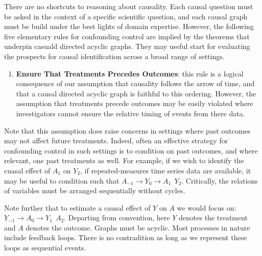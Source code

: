 \documentclass[
  single column]{article}
\providecommand{\tightlist}{%
  \setlength{\itemsep}{0pt}\setlength{\parskip}{0pt}}\usepackage{longtable,booktabs,array}
\begin{document}
There are no shortcuts to reasoning about causality. Each causal
question must be asked in the context of a specific scientific question,
and each causal graph must be build under the best lights of domain
expertise. However, the following five elementary rules for confounding
control are implied by the theorems that underpin casuald directed
acyclic graphs. They may useful start for evaluating the prospects for
causal identification across a broad range of settings.

\begin{enumerate}
\def\labelenumi{\arabic{enumi}.}
\tightlist
\item
  \textbf{Ensure That Treatments Precedes Outcomes}: this rule is a
  logical consequence of our assumption that causality follows the arrow
  of time, and that a causal directed acyclic graph is faithful to this
  ordering. However, the assumption that treatments precede outcomes may
  be easily violated where investigators cannot ensure the relative
  timing of events from there data.
\end{enumerate}

Note that this assumption does raise concerns in settings where past
outcomes may not affect future treatments. Indeed, often an effective
strategy for confounding control in such settings is to condition on
past outcomes, and where relevant, one past treatments as well. For
example, if we wish to identify the cuasal effect of \(A_1\) on \(Y_2\),
if repeated-measures time series data are available, it may be useful to
condition such that \(\boxed{A_{-1}} \to \boxed{Y_0} \to A_1 ~~ Y_2\).
Critically, the relations of variables must be arranged sequentially
without cycles.

Note further that to estimate a causal effect of \(Y\) on \(A\) we would
focus on: \(\boxed{Y_{-1}} \to \boxed{A_0} \to Y_1 ~~ A_2\). Departing
from convention, here \(Y\) denotes the treatment and \(A\) denotes the
outcome. Graphs must be acyclic. Most processes in nature include
feedback loops. There is no contradition as long as we represent these
loops as sequential events.
\end{document}

